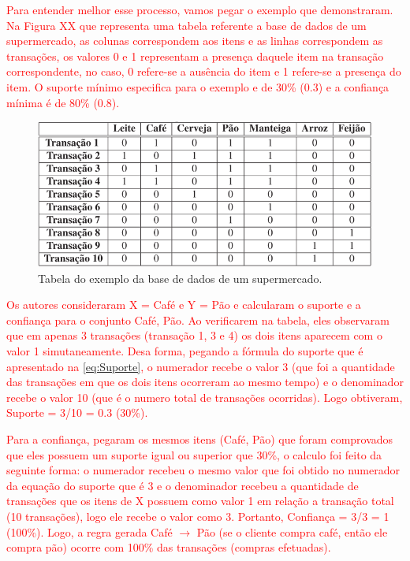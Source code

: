 \par
\textcolor{red}{Para entender melhor esse processo, vamos pegar o exemplo que  demonstraram.  Na Figura XX que representa uma tabela referente a base de dados de um supermercado, as colunas correspondem aos itens e as linhas correspondem as transações, os valores 0 e 1 representam a presença daquele item na transação correspondente, no caso, 0 refere-se a ausência do item e 1 refere-se a presença do item. O suporte mínimo especifica para o exemplo e de 30\% (0.3) e a confiança mínima é de 80\% (0.8).} 

\begin{figure}[!htp]
	\begin{center}
    \caption{\label{fig:waveform_fig} Tabela do exemplo da base de dados de um supermercado.}
	\includegraphics[scale=0.80]{Figuras/Tabela_da_base_de_supermercado.png}
	\end{center}
\end{figure}

\textcolor{red}{Os autores  consideraram X = {Café} e Y = {Pão} e calcularam o suporte e a confiança para o conjunto {Café, Pão}. Ao verificarem na tabela, eles observaram que em apenas 3 transações (transação 1, 3 e 4) os dois itens aparecem com o valor 1 simutaneamente. Desa forma, pegando a fórmula do suporte que é apresentado na \autoref{eq:Suporte}, o numerador recebe o valor 3 (que foi a quantidade das transações em que os dois itens ocorreram ao mesmo tempo) e o denominador recebe o valor 10 (que é o numero total de transações ocorridas). Logo obtiveram, Suporte = 3/10 = 0.3 (30\%).}

\par
\textcolor{red}{Para a confiança,  pegaram os mesmos itens (Café, Pão) que foram comprovados que eles possuem um suporte igual ou superior que 30\%, o calculo foi feito da seguinte forma: o numerador recebeu o mesmo valor que foi obtido no numerador da equação do suporte que é 3 e o denominador recebeu a quantidade de transações que os itens de X possuem como valor 1 em relação a transação total (10 transações), logo ele recebe o valor como 3. Portanto, Confiança = 3/3 = 1 (100\%). Logo, a regra gerada Café $\rightarrow$ Pão (se o cliente compra café, então ele compra pão) ocorre com 100\% das transações (compras efetuadas).}

